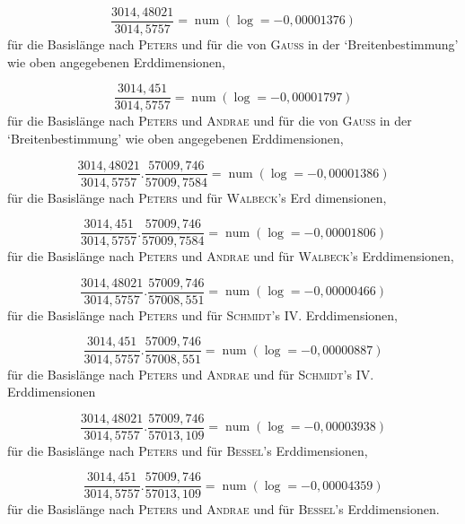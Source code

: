 %
\[
\dfrac{3014{,}48021}{3014{,}5757}=\operatorname{num}(\log=-0{,}00001376)
\]
\noindent für die Basislänge nach \textsc{Peters} und für die von \textsc{Gauss} in der ‘Breitenbestimmung’ wie oben angegebenen Erddimensionen,
\par

\[
\dfrac{3014{,}451}{3014{,}5757}=\operatorname{num}(\log=-0{,}00001797)
\]
\noindent für die Basislänge nach \textsc{Peters} und \textsc{Andrae} und für die von \textsc{Gauss} in der ‘Breitenbestimmung’ wie oben angegebenen Erddimensionen,
\par

\[
\dfrac{3014{,}48021}{3014{,}5757}.\dfrac{57009{,}746}{57009{,}7584}=\operatorname{num}(\log=-0{,}00001386)
\]
\noindent für die Basislänge nach \textsc{Peters} und für \textsc{Walbeck}’s Erd dimensionen,
\par

\[
\dfrac{3014{,}451}{3014{,}5757}.\dfrac{57009{,}746}{57009{,}7584}=\operatorname{num}(\log=-0{,}00001806)
\]
\noindent für die Basislänge nach \textsc{Peters} und \textsc{Andrae} und für \textsc{Walbeck}’s Erddimensionen,
\par

\[
\dfrac{3014{,}48021}{3014{,}5757}.\dfrac{57009{,}746}{57008{,}551}=\operatorname{num}(\log=-0{,}00000466)
\]
\noindent für die Basislänge nach \textsc{Peters} und für \textsc{Schmidt}’s IV. Erddimensionen,
\par

\[
\dfrac{3014{,}451}{3014{,}5757}.\dfrac{57009{,}746}{57008{,}551}=\operatorname{num}(\log=-0{,}00000887)
\]
\noindent für die Basislänge nach \textsc{Peters} und \textsc{Andrae} und für \textsc{Schmidt}’s IV. Erddimensionen
\par

\[
\dfrac{3014{,}48021}{3014{,}5757}.\dfrac{57009{,}746}{57013{,}109}=\operatorname{num}(\log=-0{,}00003938)
\]
\noindent für die Basislänge nach \textsc{Peters} und für \textsc{Bessel}’s Erddimensionen,
\par

\[
\dfrac{3014{,}451}{3014{,}5757}.\dfrac{57009{,}746}{57013{,}109}=\operatorname{num}(\log=-0{,}00004359)
\]
\noindent für die Basislänge nach \textsc{Peters} und \textsc{Andrae} und für \textsc{Bessel}’s Erddimensionen.
\par

